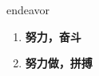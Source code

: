 
\begin{frame}
{\huge endeavor}
\begin{center}
\begin{enumerate}\Large
  \item \textbf{努力，奋斗}
  \item \textbf{努力做，拼搏}
\end{enumerate}
\end{center}
\end{frame}
